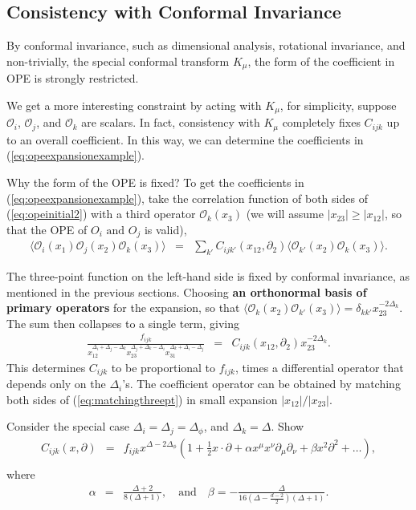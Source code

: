 \documentclass[12pt]{article}
\numberwithin{equation}{section}
\newcommand\be{\begin{eqnarray}}
\newcommand\ee{\end{eqnarray}}
\newcommand\f\phi
\newcommand\cO{\mathcal{O}}
\newcommand\p[1]{\left(#1\right)}
\newcommand\ptl\partial
\newcommand\<\langle
\renewcommand\>\rangle
\newcommand\de\delta
\newcommand\nn{\nonumber}
\renewcommand\.{\cdot}
\newcommand\De{\Delta}
\renewcommand\b\beta
\renewcommand\a\alpha
\begin{document}
\subsection{Consistency with Conformal Invariance}
By conformal invariance, such as dimensional analysis, rotational invariance, and non-trivially, the special conformal transform $K_{\mu}$, the form of the coefficient in OPE is strongly restricted.

We get a more interesting constraint by acting with $K_\mu$, for simplicity, suppose $\cO_i$, $\cO_j$, and $\cO_k$ are scalars. In fact, consistency with $K_\mu$ completely fixes $C_{ijk}$ up to an overall coefficient. In this way, we can determine the coefficients in (\ref{eq:opeexpansionexample}).

Why the form of the OPE is fixed? To get the coefficients in (\ref{eq:opeexpansionexample}), take the correlation function of both sides of (\ref{eq:opeinitial2}) with a third operator $\cO_k(x_3)$ (we will assume $|x_{23}|\geq |x_{12}|$, so that the OPE of $O_i\text{ and }O_j$ is valid),
\be
\label{eq:threetotwo}
\<\cO_i(x_1)\cO_j(x_2)\cO_k(x_3)\> &=& \sum_{k'} C_{ijk'}(x_{12},\ptl_2)\<\cO_{k'}(x_2)\cO_k(x_3)\>.
\ee

The three-point function on the left-hand side is fixed by conformal invariance, as mentioned in the previous sections. Choosing \textbf{an orthonormal basis of primary operators} for the expansion, so that $\<\cO_k(x_2)\cO_{k'}(x_3)\>= \de_{kk'}x_{23}^{-2\De_k}$.  The sum then collapses to a single term, giving
\be
\label{eq:matchingthreept}
\frac{f_{ijk}}{x_{12}^{\De_i+\De_j-\De_k}x_{23}^{\De_j+\De_k-\De_i}x_{31}^{\De_k+\De_i-\De_j}} &=& C_{ijk}(x_{12},\ptl_2)x_{23}^{-2\De_k}.
\ee
This determines $C_{ijk}$ to be proportional to $f_{ijk}$, times a differential operator that depends only on the $\De_i$'s. The coefficient operator can be obtained by matching both sides of (\ref{eq:matchingthreept}) in small expansion $|x_{12}|/|x_{23}|$.

Consider the special case $\De_i=\De_j=\De_\f$, and $\De_k=\De$.  Show
\be
\label{eq:identicalscalaropeoperator}
C_{ijk}(x,\ptl) &=& f_{ijk} x^{\De-2\De_\f}\p{1+\frac 1 2 x\.\ptl + \a x^\mu x^\nu\ptl_\mu\ptl_\nu + \b x^2 \ptl^2+\dots},\nn\\
\ee
where
\be
\label{eq:opedescendantcoefficients}
\a &=& \frac{\De+2}{8(\De+1)},\quad\textrm{and}\quad \b=-\frac{\De}{16(\De-\frac{d-2}{2})(\De+1)}.
\ee
\end{document}
